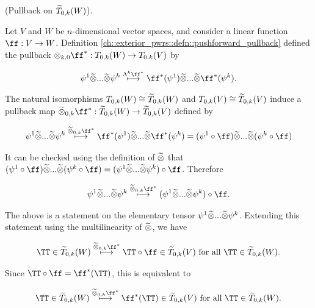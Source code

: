 \begin{deriv}
\label{ch::exterior_pwrs::deriv::pullback_on_tT0k}
    (Pullback on $\widetilde{T}_{0,k}(W)$).
    
    Let $V$ and $W$ be $n$-dimensional vector spaces, and consider a linear function $\ff:V \rightarrow W$. Definition \ref{ch::exterior_pwrs::defn::pushforward_pullback} defined the pullback $\otimes_{k, 0} \ff^*: T_{0,k}(W) \rightarrow T_{0,k}(V)$ by
    
    \begin{align*}
        \psi^1 \totimes ... \totimes \psi^k \overset{\Lambda^k \ff^*}{\longmapsto} \ff^*(\psi^1) \totimes ... \totimes \ff^*(\psi^k).
    \end{align*}
    
    The natural isomorphisms $T_{0,k}(W) \cong \widetilde{T}_{0,k}(W)$ and $T_{0,k}(V) \cong \widetilde{T}_{0,k}(V)$ induce a pullback map ${\totimes_{0,k} \ff^*:\tT_{0,k}(W) \rightarrow \tT_{0,k}(V)}$ defined by
    
    \begin{align*}
        \psi^1 \totimes ... \totimes \psi^k \overset{\totimes_{0,k} \ff^*}{\longmapsto} \ff^*(\psi^1) \totimes ... \totimes \ff^*(\psi^k) = (\psi^1 \circ \ff) \totimes ... \totimes (\psi^k \circ \ff)
    \end{align*}
    
    It can be checked using the definition of $\widetilde{\otimes}$ that $(\psi^1 \circ \ff) \totimes ... \totimes (\psi^k \circ \ff) = (\psi^1 \totimes ... \totimes \psi^k) \circ \ff$. Therefore
    
    \begin{align*}
        \psi^1 \totimes ... \totimes \psi^k \overset{\totimes_{0,k} \ff^*}{\longmapsto}
        (\psi^1 \totimes ... \totimes \psi^k) \circ \ff.
    \end{align*}
    
    The above is a statement on the elementary tensor $\psi^1 \widetilde{\otimes} ... \widetilde{\otimes} \psi^k$. Extending this statement using the multilinearity of $\widetilde{\otimes}$, we have
    
    \begin{align*}
        \TT \in \tT_{0,k}(W) \overset{\totimes_{0,k} \ff^*}{\longmapsto} \TT \circ \ff \in \tT_{0,k}(V) \text{ for all $\TT \in \tT_{0,k}(W)$}.
    \end{align*}
    
    Since $\TT \circ \ff = \ff^*(\TT)$, this is equivalent to
    
    \begin{align*}
        \TT \in \tT_{0,k}(W) \overset{\totimes_{0,k} \ff^*}{\longmapsto} \ff^*(\TT) \in \tT_{0,k}(V) \text{ for all $\TT \in \tT_{0,k}(W)$}.
    \end{align*}
    

\end{deriv}
